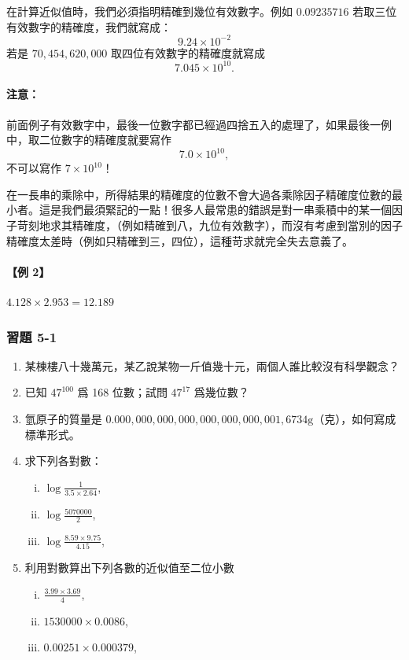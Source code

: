 在計算近似值時，我們必須指明精確到幾位有效數字。例如 $0.09235716$ 若取三位有效數字的精確度，我們就寫成：
\[
9.24 \times 10^{-2}
\]
若是 $70,454,620,000$ 取四位有效數字的精確度就寫成
\[
7.045 \times 10^{10}.
\]

\paragraph{注意：} 前面例子有效數字中，最後一位數字都已經過四捨五入的處理了，如果最後一例中，取二位數字的精確度就要寫作
\[
7.0 \times 10^{10},
\]
不可以寫作 $7 \times 10^{10}$！

在一長串的乘除中，所得結果的精確度的位數不會大過各乘除因子精確度位數的最小者。這是我們最須緊記的一點！很多人最常患的錯誤是對一串乘積中的某一個因子苛刻地求其精確度，（例如精確到八，九位有效數字），而沒有考慮到當別的因子精確度太差時（例如只精確到三，四位），這種苛求就完全失去意義了。

\paragraph{【例 2】} $4.128 \times 2.953 = 12.189$\label{note:b2-ch5-p114-ex2}

\subsubsection*{習題 5-1}
\begin{enumerate}
    \item 某棟樓八十幾萬元，某乙說某物一斤值幾十元，兩個人誰比較沒有科學觀念？
    \item 已知 $47^{100}$ 爲 168 位數；試問 $47^{17}$ 爲幾位數？
    \item 氫原子的質量是 $0.000,000,000,000,000,000,000,001,6734\text{g}$（克），如何寫成標準形式。
    \item 求下列各對數：
    \begin{enumerate}[(i)]
        \item $\log \frac{1}{3.5 \times 2.64}$,
        \item $\log \frac{5070000}{2}$,
        \item $\log \frac{8.59 \times 9.75}{4.15}$,
    \end{enumerate}
    \item 利用對數算出下列各數的近似值至二位小數
    \begin{enumerate}[(i)]
        \item $\frac{3.99 \times 3.69}{4}$,
        \item $1530000 \times 0.0086$,
        \item $0.00251 \times 0.000379$,
    \end{enumerate}
\end{enumerate}

